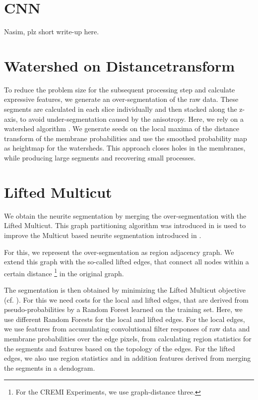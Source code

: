 \documentclass[runningheads,a4paper]{llncs}
\begin{document}
\section{CNN}\label{sec:cnn}

Nasim, plz short write-up here.


\section{Watershed on Distancetransform}\label{sec:wsdt}

To reduce the problem size for the subsequent processing step and calculate expressive features, we generate an over-segmentation of the raw data.
These segments are calculated in each slice individually and then stacked along the z-axis, to avoid under-segmentation caused by the anisotropy.
Here, we rely on a watershed algorithm \cite{couprie1997topological}.
We generate seeds on the local maxima of the distance transform of the membrane probabilities and 
use the smoothed probability map as heightmap for the watersheds.
This approach closes holes in the membranes, while producing large segments and recovering small processes.


\section{Lifted Multicut}\label{sec:lmc}

We obtain the neurite segmentation by merging the over-segmentation with the Lifted Multicut.
This graph partitioning algorithm was introduced in \cite{andres2015lifting} is used to improve the Multicut based neurite segmentation introduced in \cite{andres2012globally}.

For this, we represent the over-segmentation as region adjacency graph. We extend this graph with the so-called lifted edges, that connect all nodes within a certain distance \footnote{For the CREMI Experiments, we use graph-distance three.} in the original graph.

The segmentation is then obtained by minimizing the Lifted Multicut objective (cf. \cite{keuper2015efficient}).
For this we need costs for the local and lifted edges, that are derived from pseudo-probabilities by a Random Forest learned on the training set.
Here, we use different Random Forests for the local and lifted edges.
For the local edges, we use features from accumulating convolutional filter responses of raw data and membrane probabilities over the edge pixels, from calculating region statistics for the segments and features based on the topology of the edges.
For the lifted edges, we also use region statistics and in addition features derived from merging the segments in a dendogram.




\end{document}
